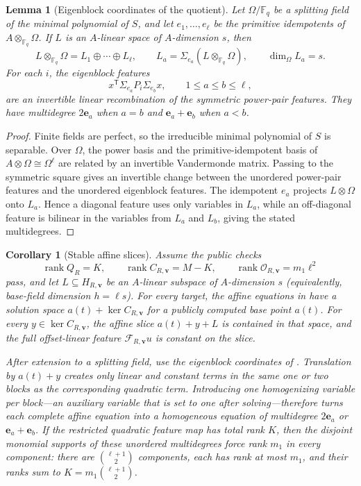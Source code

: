 \documentclass[11pt]{article}
\newtheorem{lemma}[lemma]{Lemma}
\newtheorem{corollary}[corollary]{Corollary}
\newcommand{\F}{\mathbb F}
\newcommand{\rank}{\operatorname{rank}}
\newcommand{\transpose}{\mathsf T}
\begin{document}
\begin{lemma}[Eigenblock coordinates of the quotient]\label{lem:spectral-quotient}
Let $\Omega/\F_q$ be a splitting field of the minimal polynomial of $S$, and
let $e_1,\ldots,e_\ell$ be the primitive idempotents of
$A\otimes_{\F_q}\Omega$.  If $L$ is an $A$-linear space of $A$-dimension
$s$, then
\[
 L\otimes_{\F_q}\Omega=L_1\oplus\cdots\oplus L_\ell,
 \qquad L_a=\Sigma_{e_a}(L\otimes_{\F_q}\Omega),
 \qquad \dim_\Omega L_a=s.
\]
For each $i$, the eigenblock features
\[
 x^\transpose\Sigma_{e_a}P_i\Sigma_{e_b}x,
 \qquad 1\le a\le b\le\ell,
\]
are an invertible linear recombination of the symmetric power-pair features.
They have multidegree $2\mathbf e_a$ when $a=b$ and
$\mathbf e_a+\mathbf e_b$ when $a<b$.
\end{lemma}

\begin{proof}
Finite fields are perfect, so the irreducible minimal polynomial of $S$ is
separable.  Over $\Omega$, the power basis and the primitive-idempotent basis
of $A\otimes\Omega\cong\Omega^\ell$ are related by an invertible Vandermonde
matrix.  Passing to the symmetric square gives an invertible change between the
unordered power-pair features and the unordered eigenblock features.  The
idempotent $e_a$ projects $L\otimes\Omega$ onto $L_a$.  Hence a diagonal
feature uses only variables in $L_a$, while an off-diagonal feature is bilinear
in the variables from $L_a$ and $L_b$, giving the stated multidegrees.
\end{proof}

\begin{corollary}[Stable affine slices]\label{cor:stable-slices}
Assume the public checks
\begin{equation}\label{eq:stable-preflight}
 \rank Q_R=K,\qquad
 \rank C_{R,\mathbf v}=M-K,\qquad
 \rank\mathcal O_{R,\mathbf v}=m_1\ell^2
\end{equation}
pass, and let $L\subseteq H_{R,\mathbf v}$ be an $A$-linear subspace of
$A$-dimension $s$ (equivalently, base-field dimension $h=\ell s$).  For every
target, the affine equations in  have a
solution space $a(t)+\ker C_{R,\mathbf v}$ for a publicly computed base point
$a(t)$.  For every $y\in\ker C_{R,\mathbf v}$, the affine
slice $a(t)+y+L$ is contained in that space, and the full offset-linear feature
$\mathcal F_{R,\mathbf v}u$ is constant on the slice.

After extension to a splitting field, use the eigenblock coordinates of
.  Translation by $a(t)+y$ creates only linear and
constant terms in the same one or two blocks as the corresponding quadratic
term.  Introducing one homogenizing variable per block---an auxiliary variable that
is set to one after solving---therefore turns each complete affine equation
into a homogeneous equation of multidegree
$2\mathbf e_a$ or $\mathbf e_a+\mathbf e_b$.  If the restricted quadratic
feature map has total rank $K$, then the disjoint monomial supports of these
unordered multidegrees force rank $m_1$ in every component: there are
$\binom{\ell+1}{2}$ components, each has rank at most $m_1$, and their ranks
sum to $K=m_1\binom{\ell+1}{2}$.
\end{corollary}
\end{document}
